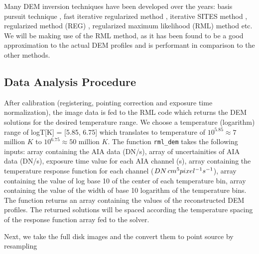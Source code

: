 Many DEM inversion techniques have been developed over the years: basis pursuit technique \citep{Cheung2015}, fast iterative regularized method \citep{Plowman2013}, iterative SITES method \citep{Morgan2019}, regularized method (REG) \citep{Hannah2012}, regularized maximum likelihood (RML) method \citep{Massa2023} etc. We will be making use of the RML method, as it has been found to be a good approximation to the actual DEM profiles and is performant in comparison to the other methods.

\subsection{Data Analysis Procedure}

After calibration (registering, pointing correction and exposure time normalization), the image data is fed to the RML code {\citep{Massa2023}} which returns the DEM solutions for the desired temperature range. We choose a temperature (logarithm) range of logT[K] = [5.85, 6.75] which translates to temperature of $10^{5.85} \approx 7 $ million $K $ to $10^{6.75} \approx 50 $ million $K$. The function \texttt{rml\_dem} takes the following inputs: array containing the AIA data (DN/s), array of uncertainities of AIA data (DN/s), exposure time value for each AIA channel (s), array containing the temperature response function for each channel ($ DN \hspace{0.5mm} cm^5 pixel^{-1} s^{-1}$), array containing the value of log base 10 of the center of each temperature bin, array containing the value of the width of base 10 logarithm of the temperature bins. The function returns an array containing the values of the reconstructed DEM profiles. The returned solutions will be spaced according the temperature spacing of the response function array fed to the solver.

Next, we take the full disk images and the convert them to point source by resampling

